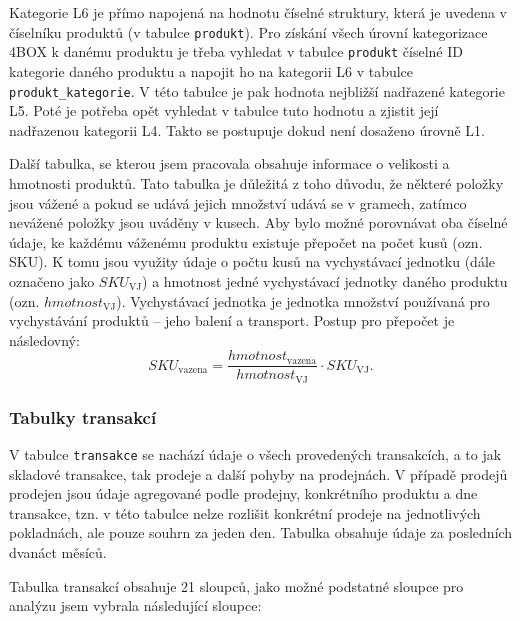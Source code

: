 Kategorie L6 je přímo napojená na hodnotu číselné struktury, která je uvedena v číselníku produktů (v tabulce \texttt{produkt}). Pro získání všech úrovní kategorizace 4BOX k danému produktu je třeba vyhledat v tabulce \texttt{produkt} číselné ID kategorie daného produktu a napojit ho na kategorii L6 v tabulce \texttt{produkt\_kategorie}. V této tabulce je pak hodnota nejbližší nadřazené kategorie L5. Poté je potřeba opět vyhledat v tabulce tuto hodnotu a zjistit její nadřazenou kategorii L4. Takto se postupuje dokud není dosaženo úrovně L1. 

Další tabulka, se kterou jsem pracovala obsahuje informace o velikosti a hmotnosti produktů. Tato tabulka je důležitá z toho důvodu, že některé položky jsou vážené a pokud se udává jejich množství udává se v gramech, zatímco nevážené položky jsou uváděny v kusech. Aby bylo možné porovnávat oba číselné údaje, ke každému váženému produktu existuje přepočet na počet kusů (ozn. SKU). K tomu jsou využity údaje o počtu kusů na vychystávací jednotku (dále označeno jako $SKU_{\mathrm{VJ}}$) a hmotnost jedné vychystávací jednotky daného produktu (ozn. $hmotnost_{\mathrm{VJ}}$). Vychystávací jednotka je jednotka množství používaná pro vychystávání produktů -- jeho balení a transport. Postup pro přepočet je následovný: $$SKU_{\mathrm{vazena}} = \frac{hmotnost_{\mathrm{vazena}} }{hmotnost_{\mathrm{VJ}}} \cdot SKU_{\mathrm{VJ}}.$$


\subsubsection{Tabulky transakcí}
V tabulce \texttt{transakce} se nachází údaje o všech provedených transakcích, a to jak skladové transakce, tak prodeje a další pohyby na prodejnách. V případě prodejů prodejen jsou údaje agregované podle prodejny, konkrétního produktu a dne transakce, tzn. v této tabulce nelze rozlišit konkrétní prodeje na jednotlivých pokladnách, ale pouze souhrn za jeden den. Tabulka obsahuje údaje za posledních dvanáct měsíců.

Tabulka transakcí obsahuje 21 sloupců, jako možné podstatné sloupce pro analýzu jsem vybrala následující sloupce:

